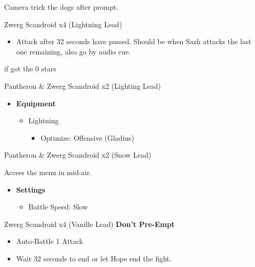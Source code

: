 	Camera trick the dogs after prompt.

	\begin{battle}[0:32]{Zwerg Scandroid x4 (Lightning Lead)}
		\begin{itemize}
			\item Attack after 32 seconds have passed. Should be when Sazh attacks the last one remaining, also go by audio cue.
		\end{itemize}
		 if got the 0 stars
	\end{battle}


	\begin{battle}[0:14]{Pantheron \& Zwerg Scandroid x2 (Lighting Lead)}
	\end{battle}


	\begin{menu}
		\begin{itemize}
			\item \textbf{Equipment}
			      \begin{itemize}
				      \item Lightning
				            \begin{itemize}
					            \item Optimize: Offensive (Gladius)
				            \end{itemize}
			      \end{itemize}
		\end{itemize}
	\end{menu}

	\begin{battle}[0:14]{Pantheron \& Zwerg Scandroid x2 (Snow Lead)}
	\end{battle}
	Access the menu in mid-air.

	\begin{menu}
		\begin{itemize}
			\item \textbf{Settings}
			      \begin{itemize}
				      \item Battle Speed: Slow
			      \end{itemize}
		\end{itemize}
	\end{menu}

	\begin{battle}[0:32]{Zwerg Scandroid x4 (Vanille Lead) \textbf{Don't Pre-Empt}}
		\begin{itemize}
			\item Auto-Battle 1 Attack
			\item Wait 32 seconds to end or let Hope end the fight.
		\end{itemize}
	\end{battle}

